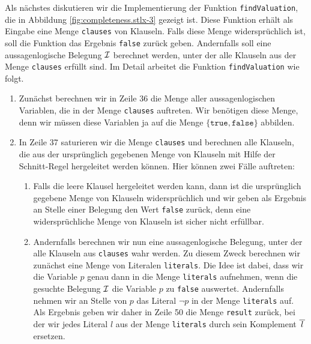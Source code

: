 Als n\"{a}chstes diskutieren wir die Implementierung der Funktion \texttt{findValuation}, die in
Abbildung \ref{fig:completeness.stlx-3} gezeigt ist.  Diese Funktion erh\"{a}lt als Eingabe eine Menge
\texttt{clauses} von Klauseln.  Falls diese Menge widerspr\"{u}chlich ist, soll die Funktion
das Ergebnis \texttt{false} zur\"{u}ck geben.  Andernfalls soll eine aussagenlogische Belegung $\mathcal{I}$ berechnet werden,
unter der alle Klauseln aus der Menge \texttt{clauses} erf\"{u}llt sind.  Im Detail arbeitet die
Funktion \texttt{findValuation} wie folgt.
\begin{enumerate}
\item Zun\"{a}chst berechnen wir in Zeile 36 die Menge aller aussagenlogischen Variablen, die in
      der Menge \texttt{clauses} auftreten.  Wir ben\"{o}tigen diese Menge, denn wir m\"{u}ssen diese
      Variablen ja auf die Menge $\{ \mathtt{true}, \mathtt{false} \}$ abbilden.
\item In Zeile 37 saturieren wir die Menge \texttt{clauses} und berechnen alle Klauseln, die aus der
      urspr\"{u}nglich gegebenen Menge von Klauseln mit Hilfe der Schnitt-Regel hergeleitet werden
      k\"{o}nnen.  Hier k\"{o}nnen zwei F\"{a}lle auftreten:
      \begin{enumerate}
      \item Falls die leere Klausel hergeleitet werden kann, dann ist die urspr\"{u}nglich gegebene Menge
            von Klauseln widerspr\"{u}chlich und wir geben als Ergebnis an Stelle einer Belegung den
            Wert \texttt{false} zur\"{u}ck, denn eine widerspr\"{u}chliche Menge von Klauseln ist sicher
            nicht erf\"{u}llbar.
      \item Andernfalls berechnen wir nun eine aussagenlogische Belegung, unter der alle Klauseln aus
            \texttt{clauses} wahr werden.  Zu diesem Zweck berechnen wir zun\"{a}chst eine Menge von
            Literalen \texttt{literals}.  Die Idee ist dabei, dass wir die Variable $p$ genau
            dann in die Menge \texttt{literals} aufnehmen, wenn die gesuchte Belegung $\mathcal{I}$ die
            Variable $p$ zu \texttt{false} auswertet.  Andernfalls nehmen wir an Stelle von $p$ das
            Literal $\neg p$ in der Menge \texttt{literals} auf.  Als Ergebnis geben wir daher in
            Zeile 50 die Menge \texttt{result} zur\"{u}ck, bei der wir jedes Literal $l$ aus der 
            Menge \texttt{literals} durch sein Komplement $\overline{\,l\,}$ ersetzen.  


\end{enumerate}
\end{enumerate}
